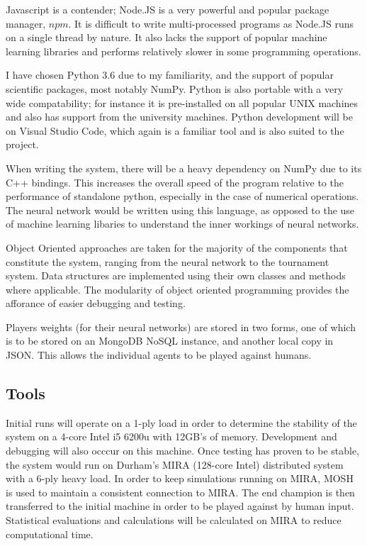 \documentclass[12pt,a4paper]{article}
\begin{document}
    Javascript is a contender; Node.JS is a very powerful and popular package manager, $npm$. It is difficult to write multi-processed programs as Node.JS runs on a single thread by nature. It also lacks the support of popular machine learning libraries and performs relatively slower in some programming operations.

    I have chosen Python 3.6 due to my familiarity, and the support of popular scientific packages, most notably NumPy. Python is also portable with a very wide compatability; for instance it is pre-installed on all popular UNIX machines and also has support from the university machines. Python development will be on Visual Studio Code, which again is a familiar tool and is also suited to the project.

    When writing the system, there will be a heavy dependency on NumPy due to its C++ bindings. This increases the overall speed of the program relative to the performance of standalone python, especially in the case of numerical operations. The neural network would be written using this language, as opposed to the use of machine learning libaries to understand the inner workings of neural networks.

    Object Oriented approaches are taken for the majority of the components that constitute the system, ranging from the neural network to the tournament system. Data structures are implemented using their own classes and methods where applicable. The modularity of object oriented programming provides the afforance of easier debugging and testing.

    Players weights (for their neural networks) are stored in two forms, one of which is to be stored on an MongoDB NoSQL instance, and another local copy in JSON. This allows the individual agents to be played against humans.

    \subsection*{Tools}

    Initial runs will operate on a 1-ply load in order to determine the stability of the system on a 4-core Intel i5 6200u with 12GB's of memory. Development and debugging will also occcur on this machine. Once testing has proven to be stable, the system would run on Durham's MIRA (128-core Intel) distributed system with a 6-ply heavy load. In order to keep simulations running on MIRA, MOSH is used to maintain a consistent connection to MIRA. The end champion is then transferred to the initial machine in order to be played against by human input. Statistical evaluations and calculations will be calculated on MIRA to reduce computational time.
\end{document}
